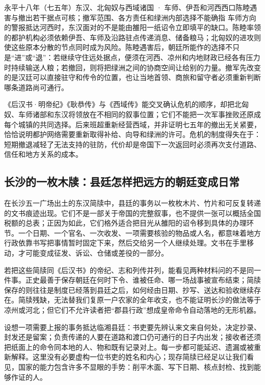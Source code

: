 \begin{event}{}{永平十八年（七五年）}{东汉、北匈奴与西域诸国 · 车师、伊吾和河西西口}{陈睦遇害与撤出若干据点可核；撤军范围、各方责任和绿洲内部选择不能确指}
车师方向的警报抵达河西时，东汉面对的不是能由雒阳一纸诏令立即填平的缺口。陈睦率领的都护机构必须依赖伊吾、车师及沿路驻点传递消息、储备粮马；北匈奴的进攻则使这些原本分散的节点同时成为风险。陈睦遇害后，朝廷所能作的选择不只是“进”或“退”：若继续守住远处据点，便须在河西、凉州和内地财政已经各有压力时持续输送人粮；若撤回，则将把绿洲之间的协商空间让给别的力量。撤军先改变的是汉廷可以直接驻守和传令的位置，也让当地首领、商旅和留守者必须重新判断哪条道路尚可通行。

《后汉书·明帝纪》《耿恭传》与《西域传》能交叉确认危机的顺序，却把北匈奴、车师诸部和东汉将领放在不相同的叙事位置；它们不能把一次军事挫败还原成每个城镇的共同选择。后来班超重新经营西域，并非证明七五年的撤出无关紧要，恰恰说明都护网络需要重新取得补给、向导和绿洲的许可。危机的制度得失在于：短期撤退减轻了无法支持的驻防，代价却是帝国下一次返回时必须再次支付道路、信任和地方关系的成本。
\end{event}
\subsection{长沙的一枚木牍：县廷怎样把远方的朝廷变成日常}

在长沙五一广场出土的东汉简牍中，县廷的事务以一枚枚木片、竹片和可反复转递的文书痕迹出现。它们不是一部关于帝国的完整叙事，也不提供一张可以概括全国税额的总表；正因为如此，它们格外适合把目光从雒阳的诏令移到具体的办理环节。一个日期、一个官名、一次收发、一项需要核验的物品或人名，都意味着地方行政依靠书写把事情暂时固定下来，然后交给另一个人继续处理。文书在手里移动，才可能变成征发、诉讼、仓储或差役的一部分。

若把这些简牍同《后汉书》的帝纪、志和列传并列，能看见两种材料问的不是同一件事。正史最善于保存朝廷在何时下令、谁被任命、哪一场战事被宣布结束；简牍保存的则往往是制度已经落到县廷之后，如何经由日期、抄写、送达和验收继续存在。简牍残缺，无法替我们复原一户农家的全年收支，也不能证明长沙的做法等于凉州或河北；但它们不允许读者把“郡县行政”想成皇帝命令自动落地的无形机器。

设想一项需要上报的事务抵达临湘县廷：书吏要先辨认来文来自何处，决定抄录、封发还是留案；负责传递的人要在道路和渡口仍可通行的日子内出发；接收者还须把纸面上的命令同本地的人、物和既有记录对上。每一步都可能延迟、遗漏或被重新解释。这里没有必要虚构一位书吏的姓名和内心；现存简牍已经足以让我们看见，国家的能力包含许多不显眼的手势：削平木面、写下日期、核点封检、找到能够作证的人。

